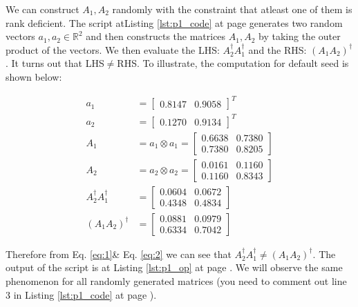 \documentclass[11pt]{article}
\newcommand{\mat}[1]{\begin{bmatrix}#1\end{bmatrix}}
\newcommand{\refEq}[1]{Eq. \ref{#1}}
\newcommand{\reflst}[1]{Listing \ref{#1} at page \pageref{#1}}
\begin{document}

We can construct $A_1,A_2$ randomly with the constraint that atleast one of them is rank deficient. The script at\reflst{lst:p1_code} generates two random vectors $a_1,a_2 \in \mathbb{R}^2$  and then constructs the matrices $A_1,A_2$ by taking the outer product of the vectors. We then evaluate the LHS: $A_2^{\dagger}A_1^{\dagger}$ and the RHS: $(A_1A_2)^{\dagger}$. It turns out that LHS$\neq$RHS. To illustrate, the computation for default seed is shown below:

\begin{align}
 a_1 &=\mat{
    0.8147&
    0.9058}^T\nonumber\\
% 
a_2 &=\mat{
    0.1270&
    0.9134}^T\nonumber\\
%     
A_1 &=a_1\otimes a_1 = \mat{
    0.6638&    0.7380\\
    0.7380&    0.8205}\nonumber\\
% 
A_2 &=a_2\otimes a_2= \mat{
    0.0161&   0.1160\\
    0.1160&    0.8343}\nonumber\\
%     
A_2^\dagger A_1^\dagger &= \mat{
    0.0604&    0.0672\\
    0.4348&    0.4834}\label{eq:1}\\
% 
(A_1A_2)^\dagger &= \mat{
    0.0881&    0.0979\\
    0.6334&    0.7042}\label{eq:2}
\end{align}

Therefore from \refEq{eq:1}\& \refEq{eq:2} we can see that $A_2^{\dagger}A_1^{\dagger} \neq (A_1A_2)^{\dagger}$. The output of the script is at \reflst{lst:p1_op}. We will observe the same phenomenon for all randomly generated matrices (you need to comment out line 3 in \reflst{lst:p1_code}).
\end{document}
